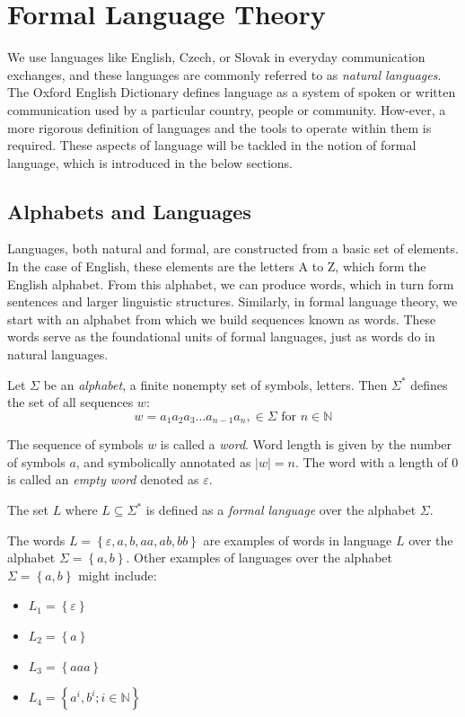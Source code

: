 \section{Formal Language Theory}\label{sec:formal-language-theory}
We use languages like English, Czech, or Slovak in everyday communication exchanges, and these languages are commonly referred to as \emph{natural languages}. The Oxford English Dictionary defines language as a system of spoken or written communication used by a particular country, people or community. How-ever, a more rigorous definition of languages and the tools to operate within them is required. These aspects of language will be tackled in the notion of formal language, which is introduced in the below sections.

\subsection{Alphabets and Languages}


Languages, both natural and formal, are constructed from a basic set of elements. In the case of English, these elements are the letters A to Z, which form the English alphabet. From this alphabet, we can produce words, which in turn form sentences and larger linguistic structures. Similarly, in formal language theory, we start with an alphabet from which we build sequences known as words. These words serve as the foundational units of formal languages, just as words do in natural languages.

\begin{definition}[Alphabet]\label{def:alphabet}
Let $\Sigma$ be an \emph{alphabet}, a finite nonempty set of symbols, letters. Then $\Sigma ^{*}$ defines the set of all sequences $w$:
$$w= a_1 a_2 a_3 \dots a_{n-1} a_n, \in \Sigma \text{ for } n \in \mathbb{N}$$
\end{definition}

The sequence of symbols $w$ is called a \emph{word}. Word length is given by the number of symbols $a$, and symbolically annotated as $|w| = n$. The word with a length of 0 is called an \emph{empty word} denoted as $\varepsilon$.

\begin{definition}[Language]\label{def:language}
The set $L$ where $L\subseteq \Sigma^{*}$ is defined as a \emph{formal language} over the alphabet $\Sigma$. 
\end{definition}
The words $L = \left\lbrace \varepsilon, a, b, aa, ab, bb \right\rbrace$ are examples of words in language $L$ over the alphabet $\Sigma=\left\lbrace a,b \right\rbrace$.
Other examples of languages over the alphabet $\Sigma=\left\lbrace a,b \right\rbrace$ might include:
\begin{itemize}
\item $L_1 = \left\lbrace \varepsilon \right\rbrace$
\item $L_2 = \left\lbrace a \right\rbrace$
\item $L_3 = \left\lbrace aaa \right\rbrace$
\item $L_4 = \left\lbrace a^i,b^i; i \in \mathbb{N} \right\rbrace$
\end{itemize}




